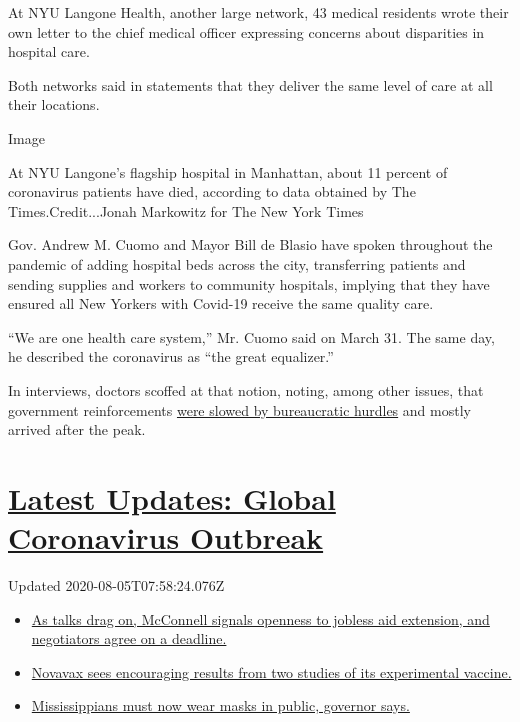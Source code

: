 At NYU Langone Health, another large network, 43 medical residents wrote
their own letter to the chief medical officer expressing concerns about
disparities in hospital care.

Both networks said in statements that they deliver the same level of
care at all their locations.

Image

At NYU Langone's flagship hospital in Manhattan, about 11 percent of
coronavirus patients have died, according to data obtained by The
Times.Credit...Jonah Markowitz for The New York Times

Gov. Andrew M. Cuomo and Mayor Bill de Blasio have spoken throughout the
pandemic of adding hospital beds across the city, transferring patients
and sending supplies and workers to community hospitals, implying that
they have ensured all New Yorkers with Covid-19 receive the same quality
care.

``We are one health care system,'' Mr. Cuomo said on March 31. The same
day, he described the coronavirus as ``the great equalizer.''

In interviews, doctors scoffed at that notion, noting, among other
issues, that government reinforcements
\href{https://www.nytimes.com/2020/04/08/nyregion/coronavirus-new-york-volunteers.html}{were
slowed by bureaucratic hurdles} and mostly arrived after the peak.

\hypertarget{latest-updates-global-coronavirus-outbreak}{%
\section{\texorpdfstring{\href{https://www.nytimes.com/2020/08/04/world/coronavirus-cases.html?action=click\&pgtype=Article\&state=default\&region=MAIN_CONTENT_1\&context=storylines_live_updates}{Latest
Updates: Global Coronavirus
Outbreak}}{Latest Updates: Global Coronavirus Outbreak}}\label{latest-updates-global-coronavirus-outbreak}}

Updated 2020-08-05T07:58:24.076Z

\begin{itemize}
\tightlist
\item
  \href{https://www.nytimes.com/2020/08/04/world/coronavirus-cases.html?action=click\&pgtype=Article\&state=default\&region=MAIN_CONTENT_1\&context=storylines_live_updates\#link-762df92}{As
  talks drag on, McConnell signals openness to jobless aid extension,
  and negotiators agree on a deadline.}
\item
  \href{https://www.nytimes.com/2020/08/04/world/coronavirus-cases.html?action=click\&pgtype=Article\&state=default\&region=MAIN_CONTENT_1\&context=storylines_live_updates\#link-1228a480}{Novavax
  sees encouraging results from two studies of its experimental
  vaccine.}
\item
  \href{https://www.nytimes.com/2020/08/04/world/coronavirus-cases.html?action=click\&pgtype=Article\&state=default\&region=MAIN_CONTENT_1\&context=storylines_live_updates\#link-794484ed}{Mississippians
  must now wear masks in public, governor says.}
\end{itemize}

